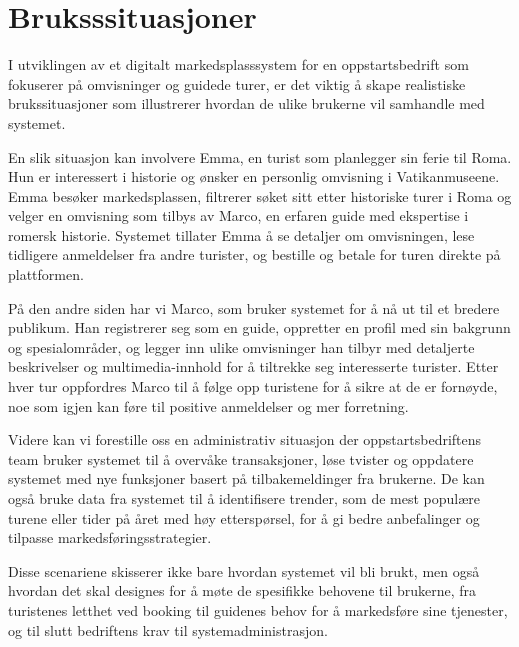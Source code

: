 \documentclass[../doc.tex]{subfiles}
\begin{document}
\section{Bruksssituasjoner}
I utviklingen av et digitalt markedsplasssystem for en oppstartsbedrift som fokuserer på omvisninger og guidede turer, er det viktig å skape realistiske brukssituasjoner som illustrerer hvordan de ulike brukerne vil samhandle med systemet.

En slik situasjon kan involvere Emma, en turist som planlegger sin ferie til Roma. Hun er interessert i historie og ønsker en personlig omvisning i Vatikanmuseene. Emma besøker markedsplassen, filtrerer søket sitt etter historiske turer i Roma og velger en omvisning som tilbys av Marco, en erfaren guide med ekspertise i romersk historie. Systemet tillater Emma å se detaljer om omvisningen, lese tidligere anmeldelser fra andre turister, og bestille og betale for turen direkte på plattformen.

På den andre siden har vi Marco, som bruker systemet for å nå ut til et bredere publikum. Han registrerer seg som en guide, oppretter en profil med sin bakgrunn og spesialområder, og legger inn ulike omvisninger han tilbyr med detaljerte beskrivelser og multimedia-innhold for å tiltrekke seg interesserte turister. Etter hver tur oppfordres Marco til å følge opp turistene for å sikre at de er fornøyde, noe som igjen kan føre til positive anmeldelser og mer forretning.

Videre kan vi forestille oss en administrativ situasjon der oppstartsbedriftens team bruker systemet til å overvåke transaksjoner, løse tvister og oppdatere systemet med nye funksjoner basert på tilbakemeldinger fra brukerne. De kan også bruke data fra systemet til å identifisere trender, som de mest populære turene eller tider på året med høy etterspørsel, for å gi bedre anbefalinger og tilpasse markedsføringsstrategier.

Disse scenariene skisserer ikke bare hvordan systemet vil bli brukt, men også hvordan det skal designes for å møte de spesifikke behovene til brukerne, fra turistenes letthet ved booking til guidenes behov for å markedsføre sine tjenester, og til slutt bedriftens krav til systemadministrasjon.
\end{document}
